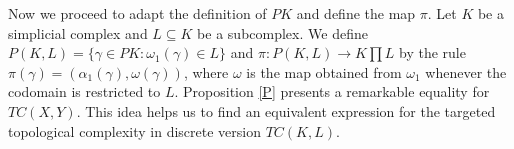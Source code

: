 \documentclass[preprint,11pt %
]{hjm1}
\newtheorem{proposition}[theorem]{Proposition}
\theoremstyle{definition}
\newtheorem{definition}[theorem]{Definition}
\newtheorem{remark}[theorem]{Remark}
\begin{document}
Now we proceed to adapt the definition of $PK$ and define the map $\pi$.
Let $K$ be a simplicial complex and $L\subseteq K$ be a subcomplex. We define $P(K,L)=\lbrace \gamma \in PK : \omega_1 (\gamma)\in L\rbrace $ and $\pi :P(K,L)\to K\prod  L$ by the rule $\pi (\gamma)=(\alpha_1 (\gamma),\omega (\gamma))$, where $\omega$ is the map obtained from $\omega_1$ whenever the codomain is restricted to $L$. 
Proposition \ref{P} presents a remarkable  equality  for $TC(X,Y)$. This idea helps us to find an equivalent expression for the targeted topological complexity in discrete version $TC(K,L)$. %
\end{document}
